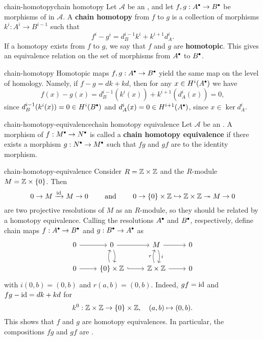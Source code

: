 \begin{topic}{chain-homotopy}{chain homotopy}
    Let $\mathcal{A}$ be an , and let $f, g : A^\bdot \to B^\bdot$ be morphisms of  in $\mathcal{A}$. A \textbf{chain homotopy} from $f$ to $g$ is a collection of morphisms $k^i : A^i \to B^{i - 1}$ such that
    \[ f^i - g^i = d_B^{i - 1} k^i + k^{i + 1} d_A^i . \]
    If a homotopy exists from $f$ to $g$, we say that $f$ and $g$ are \textbf{homotopic}. This gives an equivalence relation on the set of morphisms from $A^\bdot$ to $B^\bdot$.
\end{topic}

\begin{example}{chain-homotopy}
    Homotopic maps $f, g : A^\bdot \to B^\bdot$ yield the same map on the level of homology. Namely, if $f - g = dk + kd$, then for any $x \in H^i(A^\bdot)$ we have
    \[ f(x) - g(x) = d_B^{i - 1}(k^i(x)) + k^{i + 1}(d_A^i(x)) = 0 , \]
    since $d_B^{i - 1}(k^i(x)) = 0 \in H^{i}(B^\bdot)$ and $d_A^i(x) = 0 \in H^{i + 1}(A^\bdot)$, since $x \in \ker d_A^i$.
\end{example}

\begin{topic}{chain-homotopy-equivalence}{chain homotopy equivalence}
    Let $\mathcal{A}$ be an . A morphism of  $f : M^\bdot \to N^\bdot$ is called a \textbf{chain homotopy equivalence} if there exists a morphism $g : N^\bdot \to M^\bdot$ such that $fg$ and $gf$ are  to the identity morphism.
\end{topic}

\begin{example}{chain-homotopy-equivalence}
    Consider $R = \mathbb{Z} \times \mathbb{Z}$ and the $R$-module $M = \mathbb{Z} \times \{ 0 \}$. Then
    \[ 0 \to M \xrightarrow{\text{id}} M \to 0 \qquad \textup{ and } \qquad  0 \to \{ 0 \} \times \mathbb{Z} \hookrightarrow \mathbb{Z} \times \mathbb{Z} \twoheadrightarrow M \to 0 \]
    are two projective resolutions of $M$ as an $R$-module, so they should be related by a homotopy equivalence. Calling the resolutions $A^\bdot$ and $B^\bdot$, respectively, define chain maps $f : A^\bdot \to B^\bdot$ and $g : B^\bdot \to A^\bdot$ as
    \[ \begin{tikzcd}
        0 \arrow{r} & 0 \arrow[bend left=20]{d} \arrow{r} & M \arrow[bend left=20]{d}{i} \arrow{r} & 0 \\
        0 \arrow{r} & \{ 0 \} \times \ZZ \arrow[bend left=20]{u} \arrow[hookrightarrow]{r} & \ZZ \times \ZZ \arrow[bend left=20]{u}{r} \arrow{r} & 0
    \end{tikzcd} \]
    with $i(0, b) = (0, b)$ and $r(a, b) = (0, b)$. Indeed, $gf = \text{id}$ and $fg - \text{id} = dk + kd$ for
    \[ k^0 : \mathbb{Z} \times \mathbb{Z} \to \{ 0 \} \times \mathbb{Z}, \quad (a, b) \mapsto (0, b) . \]
    This shows that $f$ and $g$ are homotopy equivalences. In particular, the compositions $fg$ and $gf$ are .
\end{example}

